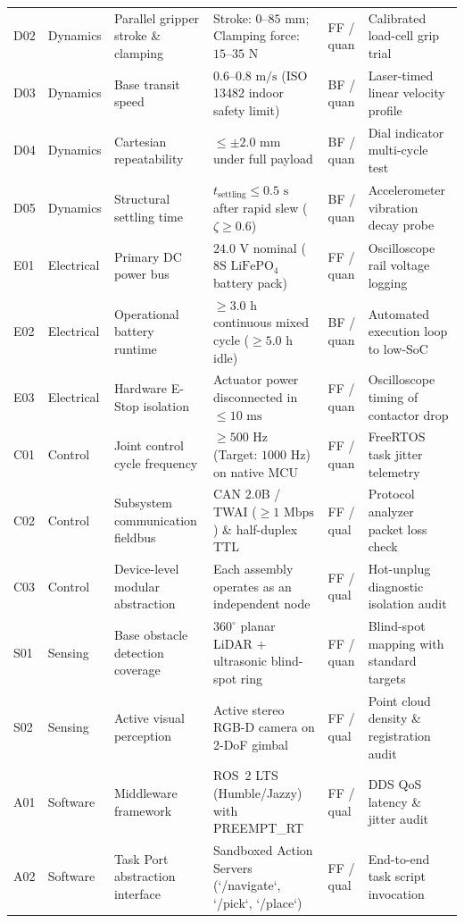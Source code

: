 \documentclass[10pt,a4paper]{article}
\begin{document}
\begin{table}[ht]
\begin{tabularx}{\textwidth}{@{}llXllY@{}}
D02 & Dynamics & Parallel gripper stroke \& clamping & Stroke: $0\text{--}85\text{ mm}$; Clamping force: $15\text{--}35\text{ N}$ & FF / quan & Calibrated load-cell grip trial \\
D03 & Dynamics & Base transit speed & $0.6\text{--}0.8\text{ m/s}$ (ISO 13482 indoor safety limit) & BF / quan & Laser-timed linear velocity profile \\
D04 & Dynamics & Cartesian repeatability & $\le \pm 2.0\text{ mm}$ under full payload & BF / quan & Dial indicator multi-cycle test \\
D05 & Dynamics & Structural settling time & $t_{\text{settling}} \le 0.5\text{ s}$ after rapid slew ($\zeta \ge 0.6$) & BF / quan & Accelerometer vibration decay probe \\
E01 & Electrical & Primary DC power bus & $24.0\text{ V}$ nominal ($8\text{S LiFePO}_4$ battery pack) & FF / quan & Oscilloscope rail voltage logging \\
E02 & Electrical & Operational battery runtime & $\ge 3.0\text{ h}$ continuous mixed cycle ($\ge 5.0\text{ h}$ idle) & BF / quan & Automated execution loop to low-SoC \\
E03 & Electrical & Hardware E-Stop isolation & Actuator power disconnected in $\le 10\text{ ms}$ & FF / quan & Oscilloscope timing of contactor drop \\
C01 & Control & Joint control cycle frequency & $\ge 500\text{ Hz}$ (Target: $1000\text{ Hz}$) on native MCU & FF / quan & FreeRTOS task jitter telemetry \\
C02 & Control & Subsystem communication fieldbus & CAN 2.0B / TWAI ($\ge 1\text{ Mbps}$) \& half-duplex TTL & FF / qual & Protocol analyzer packet loss check \\
C03 & Control & Device-level modular abstraction & Each assembly operates as an independent node & FF / qual & Hot-unplug diagnostic isolation audit \\
S01 & Sensing & Base obstacle detection coverage & $360^\circ$ planar LiDAR + ultrasonic blind-spot ring & FF / quan & Blind-spot mapping with standard targets \\
S02 & Sensing & Active visual perception & Active stereo RGB-D camera on 2-DoF gimbal & FF / qual & Point cloud density \& registration audit \\
A01 & Software & Middleware framework & ROS~2 LTS (Humble/Jazzy)~\cite{ros2} with PREEMPT\_RT & FF / qual & DDS QoS latency \& jitter audit \\
A02 & Software & Task Port abstraction interface & Sandboxed Action Servers (`/navigate`, `/pick`, `/place`) & FF / qual & End-to-end task script invocation \\

\end{tabularx}
\end{table}
\end{document}
